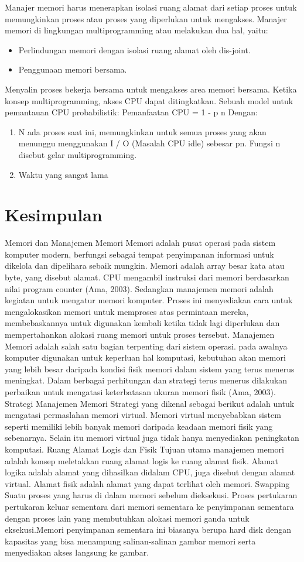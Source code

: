 Manajer memori harus menerapkan isolasi ruang alamat dari setiap proses untuk memungkinkan proses atau proses yang diperlukan untuk mengakses. Manajer memori di lingkungan multiprogramming atau melakukan dua hal, yaitu:
\begin{itemize}
\item Perlindungan memori dengan isolasi ruang alamat oleh dis-joint.
\item Penggunaan memori bersama.
\end{itemize}

Menyalin proses bekerja bersama untuk mengakses area memori bersama. Ketika konsep multiprogramming, akses CPU dapat ditingkatkan. Sebuah model untuk pemantauan CPU probabilistik:
Pemanfaatan CPU = 1 - p n
Dengan:
\begin{enumerate}
\item N ada proses saat ini, memungkinkan untuk semua proses yang akan menunggu menggunakan I / O (Masalah CPU idle) sebesar pn. Fungsi n disebut gelar multiprogramming.
\item Waktu yang sangat lama
\end{enumerate}

\section {Kesimpulan}
Memori dan Manajemen Memori
Memori adalah pusat operasi pada sistem komputer modern, berfungsi sebagai tempat penyimpanan informasi untuk dikelola dan dipelihara sebaik mungkin. Memori adalah array besar kata atau byte, yang disebut alamat. CPU mengambil instruksi dari memori berdasarkan nilai program counter (Ama, 2003).
Sedangkan manajemen memori adalah kegiatan untuk mengatur memori komputer. Proses ini menyediakan cara untuk mengalokasikan memori untuk memproses atas permintaan mereka, membebaskannya untuk digunakan kembali ketika tidak lagi diperlukan dan mempertahankan alokasi ruang memori untuk proses tersebut. Manajemen Memori adalah salah satu bagian terpenting dari sistem operasi. pada awalnya komputer  digunakan untuk keperluan hal komputasi, kebutuhan akan memori yang lebih besar daripada kondisi fisik memori dalam sistem yang terus menerus meningkat. Dalam berbagai perhitungan dan strategi terus menerus dilakukan perbaikan untuk mengatasi keterbatasan ukuran memori fisik (Ama, 2003).
Strategi Manajemen Memori
Strategi yang dikenal sebagai berikut adalah untuk mengatasi permaslahan memori virtual. Memori virtual menyebabkan sistem seperti memiliki lebih banyak memori daripada keadaan memori fisik yang sebenarnya. Selain itu memori virtual juga tidak hanya menyediakan peningkatan komputasi.
Ruang Alamat Logis dan Fisik
Tujuan utama manajemen memori adalah konsep meletakkan ruang alamat logis ke ruang alamat fisik. Alamat logika adalah alamat yang dihasilkan didalam CPU, juga disebut dengan alamat virtual. Alamat fisik adalah alamat yang dapat terlihat oleh memori.
Swapping
Suatu proses yang harus di dalam memori sebelum dieksekusi. Proses pertukaran pertukaran keluar sementara dari memori sementara ke penyimpanan sementara dengan proses lain yang membutuhkan alokasi memori ganda untuk eksekusi.Memori penyimpanan sementara ini biasanya berupa hard disk dengan kapasitas yang bisa menampung salinan-salinan gambar memori serta menyediakan akses langsung ke gambar.